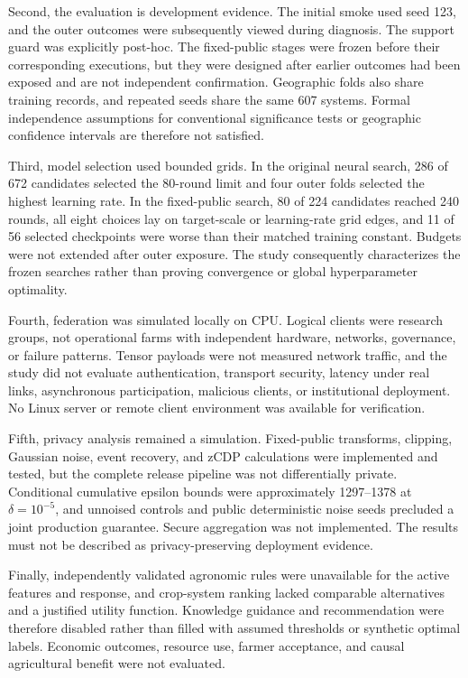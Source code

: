 \documentclass[journal]{IEEEtran}
\begin{document}
Second, the evaluation is development evidence. The initial smoke used seed 123,
and the outer outcomes were subsequently viewed during diagnosis. The support
guard was explicitly post-hoc. The fixed-public stages were frozen before their
corresponding executions, but they were designed after earlier outcomes had been
exposed and are not independent confirmation. Geographic folds also share
training records, and repeated seeds share the same 607 systems. Formal
independence assumptions for conventional significance tests or geographic
confidence intervals are therefore not satisfied.

Third, model selection used bounded grids. In the original neural search, 286 of
672 candidates selected the 80-round limit and four outer folds selected the
highest learning rate. In the fixed-public search, 80 of 224 candidates reached
240 rounds, all eight choices lay on target-scale or learning-rate grid edges,
and 11 of 56 selected checkpoints were worse than their matched training
constant. Budgets were not extended after outer exposure. The study consequently
characterizes the frozen searches rather than proving convergence or global
hyperparameter optimality.

Fourth, federation was simulated locally on CPU. Logical clients were research
groups, not operational farms with independent hardware, networks, governance,
or failure patterns. Tensor payloads were not measured network traffic, and the
study did not evaluate authentication, transport security, latency under real
links, asynchronous participation, malicious clients, or institutional
deployment. No Linux server or remote client environment was available for
verification.

Fifth, privacy analysis remained a simulation. Fixed-public transforms,
clipping, Gaussian noise, event recovery, and zCDP calculations were implemented
and tested, but the complete release pipeline was not differentially private.
Conditional cumulative epsilon bounds were approximately 1297--1378 at
$\delta = 10^{-5}$, and unnoised controls and public deterministic noise seeds
precluded a joint production guarantee. Secure aggregation was not implemented.
The results must not be described as privacy-preserving deployment evidence.

Finally, independently validated agronomic rules were unavailable for the active
features and response, and crop-system ranking lacked comparable alternatives
and a justified utility function. Knowledge guidance and recommendation were
therefore disabled rather than filled with assumed thresholds or synthetic
optimal labels. Economic outcomes, resource use, farmer acceptance, and causal
agricultural benefit were not evaluated.
\end{document}
